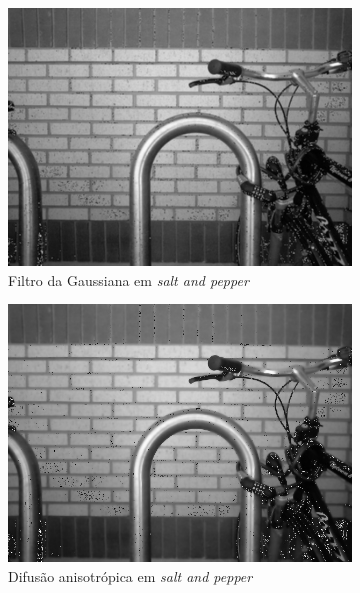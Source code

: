 \documentclass[10pt,a4paper]{article}
\begin{document}
\begin{figure}[!ht]
\begin{subfigure}[ht]{0.45\textwidth}
        \includegraphics[width=\textwidth]{sp_gaussian.jpg}
        \caption{Filtro da Gaussiana em \textit{salt and pepper}}
    \end{subfigure}
    \qquad
    \begin{subfigure}[ht]{0.45\textwidth}
        \includegraphics[width=\textwidth]{sp_aniso.jpg}
        \caption{Difusão anisotrópica em \textit{salt and pepper}}
    \end{subfigure}
    \\
    \begin{subfigure}[ht]{0.45\textwidth}

\end{subfigure}
\end{figure}
\end{document}
